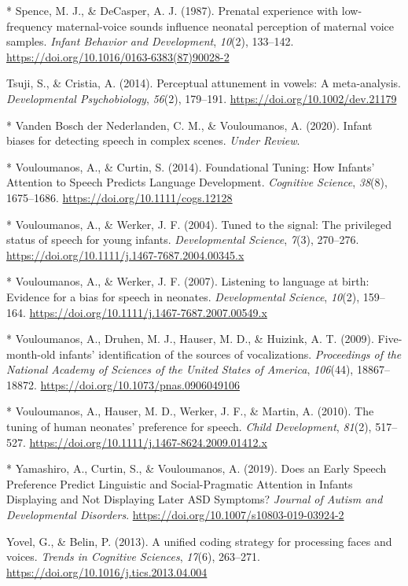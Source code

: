 \documentclass[man]{apa6}
\begin{document}
\hypertarget{ref-spence_prenatal_1987}{}
{*} Spence, M. J., \& DeCasper, A. J. (1987). Prenatal experience with
low-frequency maternal-voice sounds influence neonatal perception of
maternal voice samples. \emph{Infant Behavior and Development},
\emph{10}(2), 133--142.
\url{https://doi.org/10.1016/0163-6383(87)90028-2}

\hypertarget{ref-tsuji_perceptual_2014}{}
Tsuji, S., \& Cristia, A. (2014). Perceptual attunement in vowels: A
meta-analysis. \emph{Developmental Psychobiology}, \emph{56}(2),
179--191. \url{https://doi.org/10.1002/dev.21179}

\hypertarget{ref-vanden_bosch_der_nederlanden_infant_2020}{}
{*} Vanden Bosch der Nederlanden, C. M., \& Vouloumanos, A. (2020).
Infant biases for detecting speech in complex scenes. \emph{Under
Review}.

\hypertarget{ref-vouloumanos_foundational_2014}{}
{*} Vouloumanos, A., \& Curtin, S. (2014). Foundational Tuning: How
Infants' Attention to Speech Predicts Language Development.
\emph{Cognitive Science}, \emph{38}(8), 1675--1686.
\url{https://doi.org/10.1111/cogs.12128}

\hypertarget{ref-vouloumanos_tuned_2004}{}
{*} Vouloumanos, A., \& Werker, J. F. (2004). Tuned to the signal: The
privileged status of speech for young infants. \emph{Developmental
Science}, \emph{7}(3), 270--276.
\url{https://doi.org/10.1111/j.1467-7687.2004.00345.x}

\hypertarget{ref-vouloumanos_listening_2007}{}
{*} Vouloumanos, A., \& Werker, J. F. (2007). Listening to language at
birth: Evidence for a bias for speech in neonates. \emph{Developmental
Science}, \emph{10}(2), 159--164.
\url{https://doi.org/10.1111/j.1467-7687.2007.00549.x}

\hypertarget{ref-vouloumanos_five-month-old_2009}{}
{*} Vouloumanos, A., Druhen, M. J., Hauser, M. D., \& Huizink, A. T.
(2009). Five-month-old infants' identification of the sources of
vocalizations. \emph{Proceedings of the National Academy of Sciences of
the United States of America}, \emph{106}(44), 18867--18872.
\url{https://doi.org/10.1073/pnas.0906049106}

\hypertarget{ref-vouloumanos_tuning_2010}{}
{*} Vouloumanos, A., Hauser, M. D., Werker, J. F., \& Martin, A. (2010).
The tuning of human neonates' preference for speech. \emph{Child
Development}, \emph{81}(2), 517--527.
\url{https://doi.org/10.1111/j.1467-8624.2009.01412.x}

\hypertarget{ref-yamashiro_does_2019}{}
{*} Yamashiro, A., Curtin, S., \& Vouloumanos, A. (2019). Does an Early
Speech Preference Predict Linguistic and Social-Pragmatic Attention in
Infants Displaying and Not Displaying Later ASD Symptoms? \emph{Journal
of Autism and Developmental Disorders}.
\url{https://doi.org/10.1007/s10803-019-03924-2}

\hypertarget{ref-yovel_unified_2013}{}
Yovel, G., \& Belin, P. (2013). A unified coding strategy for processing
faces and voices. \emph{Trends in Cognitive Sciences}, \emph{17}(6),
263--271. \url{https://doi.org/10.1016/j.tics.2013.04.004}

\endgroup
\end{document}
